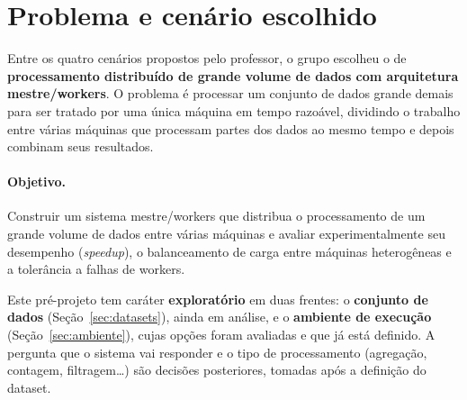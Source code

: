 \section{Problema e cenário escolhido}

Entre os quatro cenários propostos pelo professor, o grupo escolheu o de
\textbf{processamento distribuído de grande volume de dados com arquitetura
mestre/workers}. O problema é processar um conjunto de dados grande demais
para ser tratado por uma única máquina em tempo razoável, dividindo o
trabalho entre várias máquinas que processam partes dos dados ao mesmo
tempo e depois combinam seus resultados.

\paragraph{Objetivo.} Construir um sistema mestre/workers que distribua o
processamento de um grande volume de dados entre várias máquinas e
avaliar experimentalmente seu desempenho (\emph{speedup}), o balanceamento
de carga entre máquinas heterogêneas e a tolerância a falhas de workers.

Este pré-projeto tem caráter \textbf{exploratório} em duas frentes: o
\textbf{conjunto de dados} (Seção~\ref{sec:datasets}), ainda em análise,
e o \textbf{ambiente de execução} (Seção~\ref{sec:ambiente}), cujas opções
foram avaliadas e que já está definido. A pergunta que o sistema vai
responder e o tipo de processamento (agregação, contagem, filtragem\ldots)
são decisões posteriores, tomadas após a definição do dataset.
